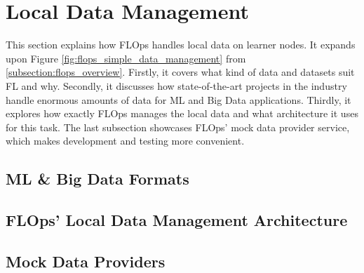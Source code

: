 \section{Local Data Management}

This section explains how FLOps handles local data on learner nodes.
It expands upon Figure \ref{fig:flops_simple_data_management} from \ref{subsection:flops_overview}.
Firstly, it covers what kind of data and datasets suit FL and why.
Secondly, it discusses how state-of-the-art projects in the industry handle enormous amounts of data for ML and Big Data applications.
Thirdly, it explores how exactly FLOps manages the local data and what architecture it uses for this task.
The last subsection showcases FLOps' mock data provider service, which makes development and testing more convenient.



\subsection{ML \& Big Data Formats}

\subsection{FLOps' Local Data Management Architecture}

\subsection{Mock Data Providers}
